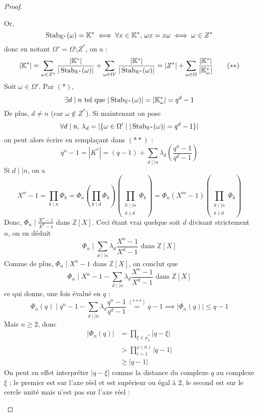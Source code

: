 \begin{proof}
\begin{itemize}
      Or,
      \[ \operatorname{Stab}_{\mathbb{K}^*}(\omega) = \mathbb{K}^* \iff \forall x \in \mathbb{K}^*, \, \omega x = x \omega \iff \omega \in Z^* \]
      donc en notant $\Omega' = \Omega \setminus Z^*$, on a :
      \[ |\mathbb{K}^*| = \sum_{\omega \in Z^*} \frac{|\mathbb{K}^*|}{|\operatorname{Stab}_{\mathbb{K}^*}(\omega)|} + \sum_{\omega \in \Omega'} \frac{|\mathbb{K}^*|}{|\operatorname{Stab}_{\mathbb{K}^*}(\omega)|} = |Z^*| + \sum_{\omega \in \Omega} \frac{|\mathbb{K}^*|}{|\mathbb{K}^*_\omega|} \tag{$**$} \]
      Soit $\omega \in \Omega'$. Par $(*)$,
      \[ \exists d \mid n \text{ tel que } |\operatorname{Stab}_{\mathbb{K}^*}(\omega)| = |\mathbb{K}^*_\omega| = q^d - 1 \]
      De plus, $d \neq n$ (car $\omega \notin Z^*$). Si maintenant on pose
      \[ \forall d \mid n, \, \lambda_d = |\{ \omega \in \Omega' \mid |\operatorname{Stab}_{\mathbb{K}^*}(\omega)| = q^d - 1 \}| \]
      on peut alors écrire en remplaçant dans $(**)$ :
      \[ q^n - 1 = |K^*| = (q - 1) + \sum_{d \mid \mid n} \lambda_d \left( \frac{q^n - 1}{q^d - 1} \right) \tag{$***$} \]
      Si $d \mid \mid n$, on a
      \[ X^n-1 = \prod_{k \mid n} \Phi_k = \Phi_n \left ( \prod_{k \mid d} \Phi_k \right ) \left ( \prod_{\substack{k \mid \mid n \\ k \nmid d}} \Phi_k \right ) = \Phi_n (X^m - 1) \left ( \prod_{\substack{k \mid \mid n \\ k \nmid d}} \Phi_k \right ) \]
      Donc, $\Phi_n \mid \frac{X^n - 1}{X^d - 1}$ dans $\mathbb{Z}[X]$. Ceci étant vrai quelque soit $d$ divisant strictement $n$, on en déduit
      \[ \Phi_n \mid \sum_{d \mid \mid n} \lambda_d \frac{X^n - 1}{X^d - 1} \text{ dans } \mathbb{Z}[X] \]
      Comme de plus, $\Phi_n \mid X^n - 1$ dans $\mathbb{Z}[X]$, on conclut que
      \[ \Phi_n \mid X^n - 1 - \sum_{d \mid \mid n} \lambda_d \frac{X^n - 1}{X^d - 1} \text{ dans } \mathbb{Z}[X] \]
      ce qui donne, une fois évalué en $q$ :
      \[ \Phi_n(q) \mid q^n - 1 - \sum_{d \mid \mid n} \lambda_d \frac{q^n - 1}{q^d - 1} \overset{(***)}{=} q-1 \implies |\Phi_n(q)| \leq q-1 \]
      Mais $n \geq 2$, donc
      \begin{align*}
        |\Phi_n(q)| &= \prod_{\xi \in \mu_n^*} |q - \xi| \\
        &> \prod_{i=1}^{\varphi(n)} |q - 1| \\
        &\geq |q-1|
      \end{align*}
      On peut en effet interpréter $|q - \xi|$ comme la distance du complexe $q$ au complexe $\xi$ ; le premier est sur l'axe réel et est supérieur ou égal à $2$, le second est sur le cercle unité mais n'est pas sur l'axe réel :
      \begin{center}

\end{center}
\end{itemize}
\end{proof}

